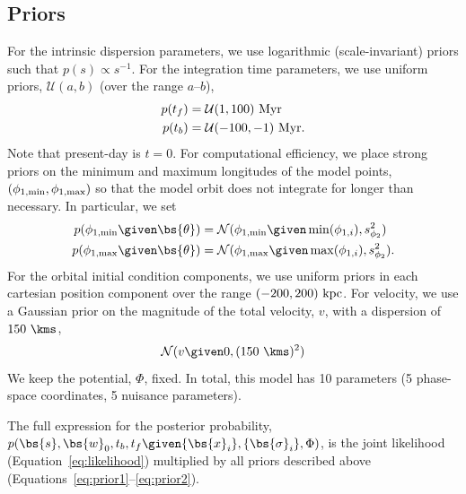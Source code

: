 \documentclass[numberedappendix]{emulateapj}
\newcommand{\norm}{\mathcal{N}}
\begin{document}
\subsection{Priors}

For the intrinsic dispersion parameters, we use logarithmic (scale-invariant) priors such that $p(s) \propto s^{-1}$. For the integration time parameters, we use uniform priors, $\mathcal{U}(a,b)$ (over the range $a$--$b$),
\begin{align}
	p(t_f) &= \mathcal{U}(1,100)~{\rm Myr}\label{eq:prior1}\\
	p(t_b) &= \mathcal{U}(-100,-1)~{\rm Myr}.
\end{align}
Note that present-day is $t=0$. For computational efficiency, we place strong priors on the minimum and maximum longitudes of the model points, $(\phi_{1,{\rm min}},\phi_{1,{\rm max}})$ so that the model orbit does not integrate for longer than necessary. In particular, we set
\begin{align}
	p(\phi_{1,{\rm min}} \given \bs{\theta}) &= \norm(\phi_{1,{\rm min}} \given \min(\phi_{1,i}), s^2_{\phi_2})\\
	p(\phi_{1,{\rm max}} \given \bs{\theta}) &= \norm(\phi_{1,{\rm max}} \given \max(\phi_{1,i}), s^2_{\phi_2}).
\end{align}
For the orbital initial condition components, we use uniform priors in each cartesian position component over the range $(-200,200)~{\rm kpc}$. For velocity, we use a Gaussian prior on the magnitude of the total velocity, $v$, with a dispersion of $150~\kms$,
\begin{equation}
	\norm(v \given 0, (150~\kms)^2) \label{eq:prior2}
\end{equation}
We keep the potential, $\Phi$, fixed. In total, this model has 10 parameters (5 phase-space coordinates, 5 nuisance parameters).

The full expression for the posterior probability, $p(\bs{s}, \bs{w}_0, t_b, t_f \given \{\bs{x}_i\}, \{\bs{\sigma}_i\}, \Phi)$, is the joint likelihood (Equation~\ref{eq:likelihood}) multiplied by all priors described above (Equations~\ref{eq:prior1}--\ref{eq:prior2}).
\end{document}
